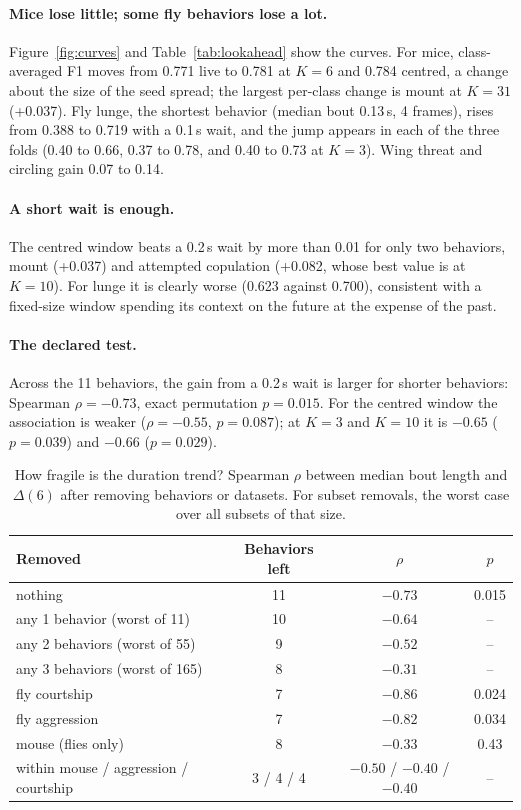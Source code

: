 \documentclass[10pt]{article}
\begin{document}
\paragraph{Mice lose little; some fly behaviors lose a lot.} Figure~\ref{fig:curves} and Table~\ref{tab:lookahead} show the curves. For mice, class-averaged F1 moves from 0.771 live to 0.781 at $K=6$ and 0.784 centred, a change about the size of the seed spread; the largest per-class change is mount at $K=31$ (+0.037). Fly lunge, the shortest behavior (median bout 0.13\,s, 4 frames), rises from 0.388 to 0.719 with a 0.1\,s wait, and the jump appears in each of the three folds (0.40 to 0.66, 0.37 to 0.78, and 0.40 to 0.73 at $K=3$). Wing threat and circling gain 0.07 to 0.14.

\paragraph{A short wait is enough.} The centred window beats a 0.2\,s wait by more than 0.01 for only two behaviors, mount (+0.037) and attempted copulation (+0.082, whose best value is at $K=10$). For lunge it is clearly worse (0.623 against 0.700), consistent with a fixed-size window spending its context on the future at the expense of the past.

\paragraph{The declared test.} Across the 11 behaviors, the gain from a 0.2\,s wait is larger for shorter behaviors: Spearman $\rho=-0.73$, exact permutation $p=0.015$. For the centred window the association is weaker ($\rho=-0.55$, $p=0.087$); at $K=3$ and $K=10$ it is $-0.65$ ($p=0.039$) and $-0.66$ ($p=0.029$).

\begin{table}[t]
\centering
\caption{How fragile is the duration trend? Spearman $\rho$ between median bout length and $\Delta(6)$ after removing behaviors or datasets. For subset removals, the worst case over all subsets of that size.}
\label{tab:robust}
\begin{tabular}{lccc}
\toprule
Removed & Behaviors left & $\rho$ & $p$ \\
\midrule
nothing & 11 & $-0.73$ & 0.015 \\
any 1 behavior (worst of 11) & 10 & $-0.64$ & -- \\
any 2 behaviors (worst of 55) & 9 & $-0.52$ & -- \\
any 3 behaviors (worst of 165) & 8 & $-0.31$ & -- \\
fly courtship & 7 & $-0.86$ & 0.024 \\
fly aggression & 7 & $-0.82$ & 0.034 \\
mouse (flies only) & 8 & $-0.33$ & 0.43 \\
\midrule
within mouse / aggression / courtship & 3 / 4 / 4 & $-0.50$ / $-0.40$ / $-0.40$ & -- \\
\bottomrule
\end{tabular}
\end{table}
\end{document}
